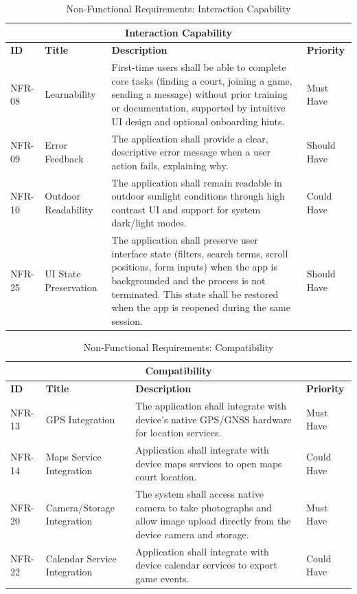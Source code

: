\begin{table}[h]
	\centering
	\caption{Non-Functional Requirements: Interaction Capability}
	\label{tab:nfr-interaction}
	\begin{tabular}{p{2cm}p{4cm}p{7cm}p{2cm}}
		\toprule
		\multicolumn{4}{c}{\textbf{Interaction Capability}}\\
		\midrule
		\textbf{ID} & \textbf{Title} & \textbf{Description} & \textbf{Priority} \\
		\midrule
		NFR-08 & Learnability & First-time users shall be able to complete core tasks (finding a court, joining a game, sending a message) without prior training or documentation, supported by intuitive UI design and optional onboarding hints. & Must Have \\
		\midrule
		NFR-09 & Error Feedback & The application shall provide a clear, descriptive error message when a user action fails, explaining why. & Should Have \\
		\midrule
		NFR-10 & Outdoor Readability & The application shall remain readable in outdoor sunlight conditions through high contrast UI and support for system dark/light modes. & Could Have \\
		\midrule
		NFR-25 & UI State Preservation & The application shall preserve user interface state (filters, search terms, scroll positions, form inputs) when the app is backgrounded and the process is not terminated. This state shall be restored when the app is reopened during the same session. & Should Have \\
		\bottomrule
	\end{tabular}
\end{table}

\vspace{1cm}

\begin{table}[h]
	\centering
	\caption{Non-Functional Requirements: Compatibility}
	\label{tab:nfr-compatibility}
	\begin{tabular}{p{2cm}p{4cm}p{7cm}p{2cm}}
		\toprule
		\multicolumn{4}{c}{\textbf{Compatibility}}\\
		\midrule
		\textbf{ID} & \textbf{Title} & \textbf{Description} & \textbf{Priority} \\
		\midrule
		NFR-13 & GPS Integration & The application shall integrate with device's native GPS/GNSS hardware for location services. & Must Have \\
		\midrule
		NFR-14 & Maps Service Integration & Application shall integrate with device maps services to open maps court location. & Could Have \\
		\midrule
		NFR-20 & Camera/Storage Integration & The system shall access native camera to take photographs and allow image upload directly from the device camera and storage. & Must Have \\
		\midrule
		NFR-22 & Calendar Service Integration & Application shall integrate with device calendar services to export game events. & Could Have \\
		\bottomrule
	\end{tabular}
\end{table}

